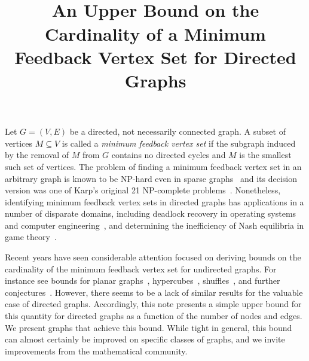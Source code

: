 \documentclass[CRMATH,Unicode,manuscript]{cedram}
\title{\vspace{-1cm}{\small Combinatorics, Graph Theory\ / Combinatoire, Th\'eorie des Graphes}\\
An Upper Bound on the Cardinality of a Minimum Feedback Vertex Set for Directed Graphs}
\author{\firstname{Philip} \middlename{N.} \lastname{Brown}\CDRorcid{0000-0003-3953-0503}}
\begin{document}
\maketitle





Let $G=(V,E)$ be a directed, not necessarily connected graph.
A subset of vertices $M\subseteq V$ is called a \emph{minimum feedback vertex set} if the subgraph induced by the removal of $M$ from $G$ contains no directed cycles and $M$ is the smallest such set of vertices.
The problem of finding a minimum feedback vertex set in an arbitrary graph is known to be NP-hard even in sparse graphs~\cite{Fomin2006,Borradaile2019} and its decision version was one of Karp's original 21 NP-complete problems~\cite{Karp1972}.
Nonetheless, identifying minimum feedback vertex sets in directed graphs has applications in a number of disparate domains, including deadlock recovery in operating systems and computer engineering~\cite{Lin2000}, and determining the inefficiency of Nash equilibria in game theory~\cite{Brown2019c}.


Recent years have seen considerable attention focused on deriving bounds on the cardinality of the minimum feedback vertex set for undirected graphs. For instance see bounds for planar graphs~\cite{Kelly2017}, hypercubes~\cite{Madelaine2008}, shuffles~\cite{Kralovic2003}, and further conjectures~\cite{Kowalik2010}.
However, there seems to be a lack of similar results for the valuable case of directed graphs.
Accordingly, this note presents a simple upper bound for this quantity for directed graphs as a function of the number of nodes and edges.
We present graphs that achieve this bound.
While tight in general, this bound can almost certainly be improved on specific classes of graphs, and we invite improvements from the mathematical community.
\end{document}
